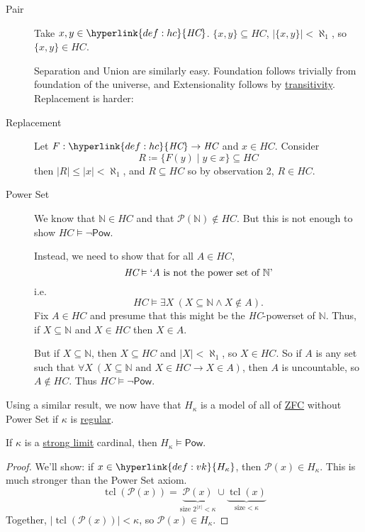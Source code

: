 \documentclass{article}
\newcommand{\hc}{\textit{HC}}
\newcommand{\1}{\mathbbm{1}}
\DeclareMathOperator{\tcl}{tcl}
\let\models\vDash
\begin{document}
\begin{description}
  \item[Pair] Take $x,y \in \hyperlink{def:hc}{\hc}$. $\{x,y\} \subseteq \hc$, $|\{x,y\}| < \aleph_1$, so $\{x,y\} \in \hc$.

    Separation and Union are similarly easy. Foundation follows trivially from foundation of the universe, and Extensionality follows by \hyperlink{def:transitive}{transitivity}.
    Replacement is harder:
  \item [Replacement] Let $F: \hyperlink{def:hc}{\hc} \to \hc$ and $x \in \hc$. Consider
    \begin{equation*}
      R \coloneqq \{F(y) \mid y \in x\} \subseteq \hc
    \end{equation*}
    then $|R| \leq |x| < \aleph_1$, and $R \subseteq \hc$ so by observation 2, $R \in \hc$.
  \item[Power Set] We know that $\mathbb{N} \in \hc$ and that $\mathcal{P}(\mathbb{N}) \notin \hc$. But this is not enough to show $\hc \models \neg \textsf{Pow}$.

    Instead, we need to show that for all $A \in \hc$,
    \begin{equation*}
      \hc \models `A \text{ is not the power set of } \mathbb{N}\text{'}
    \end{equation*}
    i.e.\
    \begin{equation*}
      \hc \models \exists X \ (X \subseteq \mathbb{N} \land X \notin A).
    \end{equation*}
    Fix $A \in \hc$ and presume that this might be the \hc-powerset of $\mathbb{N}$.
    Thus, if $X \subseteq \mathbb{N}$ and $X \in \hc$ then $X \in A$.

    But if $X \subseteq \mathbb{N}$, then $X \subseteq \hc$ and $|X| < \aleph_1$, so $X \in \hc$.
    So if $A$ is any set such that $\forall X\ (X \subseteq \mathbb{N} \text{ and } X \in \hc \rightarrow X \in A)$,
    then $A$ is uncountable, so $A \notin \hc$.
    Thus $\hc \models \neg \textsf{Pow}$.
\end{description}

\newlec
Using a similar result, we now have that \hyperlink{def:hk}{$H_\kappa$} is a model of all of \hyperlink{def:axioms}{\textsf{ZFC}} without Power Set if $\kappa$ is \hyperlink{def:reg}{regular}.
\begin{prop}
  If $\kappa$ is a \hyperlink{def:slim}{strong limit} cardinal, then $H_\kappa \models \textsf{Pow}$.
\end{prop}
\begin{proof}
  We'll show: if $x \in \hyperlink{def:vk}{H_\kappa}$, then $\mathcal{P}(x) \in H_\kappa$.
  This is much stronger than the Power Set axiom.
  \begin{equation*}
    \tcl(\mathcal{P}(x)) = \underbrace{\mathcal{P}(x)}_{\text{size } 2^{|x|} < \kappa} \cup \underbrace{\tcl(x)}_{\text{size} < \kappa}
  \end{equation*}
  Together, $|\tcl(\mathcal{P}(x))| < \kappa$, so $\mathcal{P}(x) \in H_\kappa$.
\end{proof}
\end{document}
